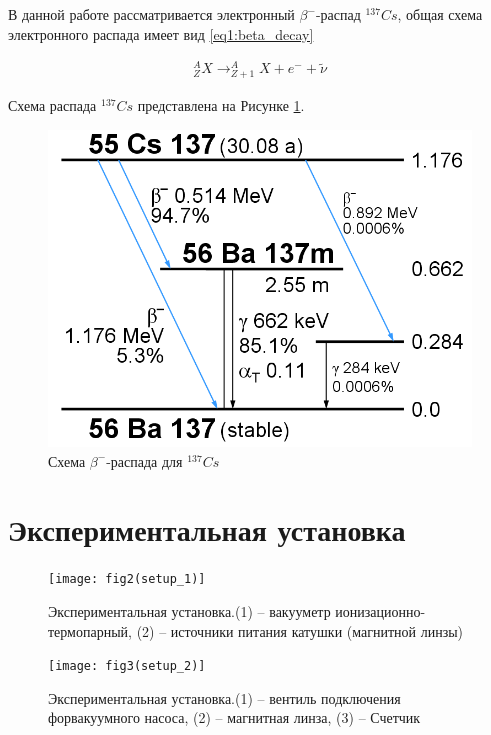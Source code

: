 \documentclass[a4paper,12pt]{article}
\begin{document}
В данной работе рассматривается электронный  $\beta^-$-распад $^{137}Cs$, общая схема электронного распада имеет вид \ref{eq1:beta_decay}

\begin{align} \label{eq1:beta_decay}
	^{A}_{Z} X \rightarrow ^{A}_{Z+1} X + e^{-} + \widetilde{\nu}
\end{align}

Схема распада $^{137}Cs$ представлена на Рисунке \ref{fig1:Cs_beta_decay}.

\begin{figure}[h]
	\centering
	\includegraphics[width=\linewidth]{fig1(Cs_beta_decay)}
	\caption{Схема $\beta^{-}$-распада для $^{137}Cs$}
	\label{fig1:Cs_beta_decay}
\end{figure}

\pagebreak

\section*{Экспериментальная установка}

\begin{figure}[h]
	\centering
	\texttt{[image: fig2(setup\_1)]}			
	\caption{Экспериментальная установка.(1) -- вакууметр ионизационно-термопарный, (2) -- источники питания катушки (магнитной линзы) }
	\label{fig2:setup_1}
\end{figure}

\begin{figure}[h]
	\centering
	\texttt{[image: fig3(setup\_2)]}			
	\caption{Экспериментальная установка.(1) -- вентиль подключения форвакуумного насоса, (2) -- магнитная линза, (3) -- Счетчик}
	\label{fig3:setup_2}
\end{figure}
\end{document}
